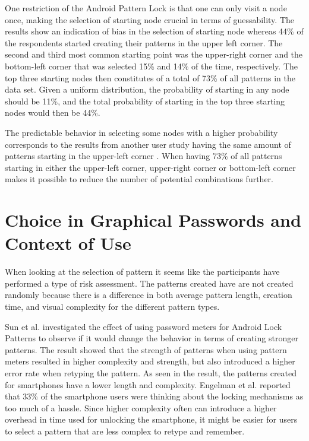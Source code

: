       One restriction of the Android Pattern Lock is that one can only visit a node once, making the selection of starting node crucial in terms of guessability. The results show an indication of bias in the selection of starting node whereas 44\% of the respondents started creating their patterns in the upper left corner. The second and third most common starting point was the upper-right corner and the bottom-left corner that was selected 15\% and 14\% of the time, respectively. The top three starting nodes then constitutes of a total of 73\% of all patterns in the data set. Given a uniform distribution, the probability of starting in any node should be 11\%, and the total probability of starting in the top three starting nodes would then be 44\%.

      The predictable behavior in selecting some nodes with a higher probability corresponds to the results from another user study having the same amount of patterns starting in the upper-left corner \cite{Uellenbeck}. When having 73\% of all patterns starting in either the upper-left corner, upper-right corner or bottom-left corner makes it possible to reduce the number of potential combinations further.

  \section{Choice in Graphical Passwords and Context of Use}
    
    When looking at the selection of pattern it seems like the participants have performed a type of risk assessment. The patterns created have are not created randomly because there is a difference in both average pattern length, creation time, and visual complexity for the different pattern types.

    Sun et al. \cite{Sun} investigated the effect of using password meters for Android Lock Patterns to observe if it would change the behavior in terms of creating stronger patterns. The result showed that the strength of patterns when using pattern meters resulted in higher complexity and strength, but also introduced a higher error rate when retyping the pattern. As seen in the result, the patterns created for smartphones have a lower length and complexity. Engelman et al. \cite{Egelman} reported that 33\% of the smartphone users were thinking about the locking mechanisms as too much of a hassle. Since higher complexity often can introduce a higher overhead in time used for unlocking the smartphone, it might be easier for users to select a pattern that are less complex to retype and remember.   


